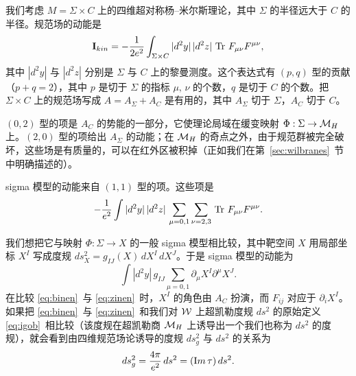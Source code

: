 我们考虑 $M=\Sigma\times C$ 上的四维超对称杨--米尔斯理论，其中 $\Sigma $ 的半径远大于 $C$ 的半径。规范场的动能是
\setcounter{equation}{11}
\begin{equation}\label{eq:kinen}
{{\cmmib I}}_{kin}=-{1\over 2e^2}\int_{\Sigma\times C}
|d^2y|\,|d^2z|\,\Tr\,F_{\mu\nu}F^{\mu\nu},
\end{equation}
其中 $|d^2y|$ 与 $|d^2z|$ 分别是 $\Sigma$ 与 $C$ 上的黎曼测度。这个表达式有 $(p,q)$ 型的贡献（$p+q=2$），其中 $p$ 是切于 $\Sigma$ 的指标 $\mu,\,\nu$ 的个数，$q$ 是切于 $C$ 的个数。把 $\Sigma\times C$ 上的规范场写成 $A=A_\Sigma+A_C$ 是有用的，其中 $A_\Sigma$ 切于 $\Sigma$，$A_C$ 切于 $C$。

$(0,2)$ 型的项是 $A_C$ 的势能的一部分，它使理论局域在缓变映射 $\Phi:\Sigma\to \MH$ 上。$(2,0)$ 型的项给出 $A_\Sigma$ 的动能；在 $\MH$ 的奇点之外，由于规范群被完全破坏，这些场是有质量的，可以在红外区被积掉（正如我们在第~\ref{sec:wilbranes}~节 中明确描述的）。

sigma 模型的动能来自 $(1,1)$ 型的项。这些项是%
\setcounter{equation}{12}
\begin{equation}\label{eq:binen}
-{1\over e^2}\int
|d^2y|\,|d^2z|\,\sum_{\mu=0,1}\sum_{\nu=2,3}\,\Tr\,F_{\mu\nu}F^{\mu\nu}.
\end{equation}

我们想把它与映射 $\Phi:\Sigma\to X$ 的一般 sigma 模型相比较，其中靶空间 $X$ 用局部坐标 $X^I$ 写成度规 $ds^2_X=g_{IJ}(X)\,dX^I\,dX^J$。于是 sigma 模型的动能为
\setcounter{equation}{13}
\begin{equation}\label{eq:zinen}
\int |d^2y|\, g_{IJ}\sum_{\mu=0,1}\partial_\mu
X^I\partial^\mu X^J.
\end{equation}
在比较 \eqref{eq:binen}\ 与 \eqref{eq:zinen}\ 时，$X^I$ 的角色由 $A_C$ 扮演，而 $F_{ij}$ 对应于 $\partial_i X^I$。如果把 \eqref{eq:binen}\ 与 \eqref{eq:zinen}\ 和我们对 ${\EUW}$ 上超凯勒度规 $ds^2$ 的原始定义 \eqref{eq:igob}\ 相比较（该度规在超凯勒商 $\MH$ 上诱导出一个我们也称为 $ds^2$ 的度规），就会看到由四维规范场论诱导的度规 $ds^2_g$ 与 $ds^2$ 的关系为%
\setcounter{equation}{14}
\begin{equation}\label{eq:inog}
ds^2_g={4\pi\over e^2}\,ds^2=({\rm
Im}\,\tau)\,ds^2.
\end{equation}

